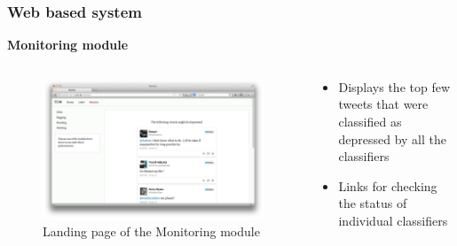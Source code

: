 \documentclass{beamer}
\begin{document}
    \begin{frame}
        \frametitle{Web based system}
        \begin{center}
            \textbf{Monitoring module}
        \end{center}
        \begin{columns}
            \begin{column}{0.5\textwidth}
                \begin{figure}
                    \centering
                    \includegraphics[width=\textwidth]{figures/monitoring_landing_1.png}
                    \caption{Landing page of the Monitoring module}
                \end{figure}
            \end{column}
            \begin{column}{0.5\textwidth}
                \begin{itemize}
                    \item{Displays the top few tweets that were classified as depressed by all the classifiers}
                    \item{Links for checking the status of individual classifiers}
                \end{itemize}
            \end{column}
        \end{columns}
    \end{frame}
    
\end{document}
